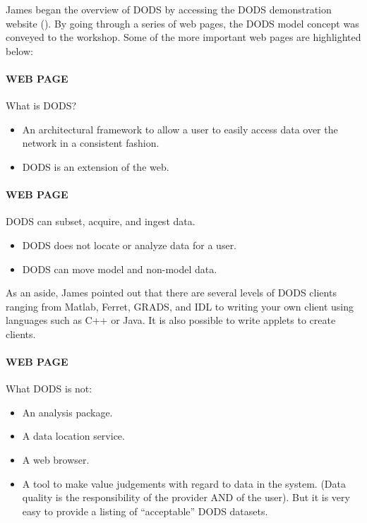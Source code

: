 James began the overview of DODS by accessing the DODS demonstration
website
().
By going through a series of web pages, the DODS model concept was
conveyed to the workshop.  Some of the more important web pages are
highlighted below:

\paragraph{WEB PAGE}  What is DODS? 
\begin{itemize}
\item An architectural framework to allow a user to easily access data
  over the network in a consistent fashion.
\item DODS is an extension of the web.
\end{itemize}

\paragraph{WEB PAGE}  DODS can subset, acquire, and ingest data.  
\begin{itemize}
\item DODS does not locate or analyze data for a user.
\item DODS can move model and non-model data.  
\end{itemize}

As an aside, James pointed out that there are several levels of DODS
clients ranging from Matlab, Ferret, GRADS, and IDL to writing your
own client using languages such as C++ or Java.  It is also possible
to write applets to create clients.

\paragraph{WEB PAGE}  What DODS is not:
\begin{itemize}
\item An analysis package.
\item A data location service.
\item A web browser.
\item A tool to make value judgements with regard to data in the
  system. (Data quality is the responsibility of the provider AND of
  the user). But it is very easy to provide a listing of
  ``acceptable'' DODS datasets.
\end{itemize}

